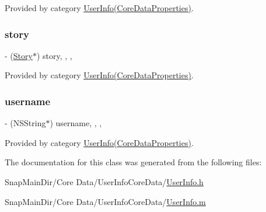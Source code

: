 Provided by category \hyperlink{category_user_info_07_core_data_properties_08_afdfa30db3ce1f305298e33e693e626e8}{User\+Info(\+Core\+Data\+Properties)}.

\hypertarget{interface_user_info_afeb3aca2ca38cb9b64ca84ee98e90260}{}\label{interface_user_info_afeb3aca2ca38cb9b64ca84ee98e90260} 
\subsubsection{\texorpdfstring{story}{story}}
{\footnotesize\ttfamily -\/ (\hyperlink{interface_story}{Story}$\ast$) story\hspace{0.3cm}{\ttfamily [read]}, {\ttfamily [write]}, {\ttfamily [nonatomic]}, {\ttfamily [retain]}}



Provided by category \hyperlink{category_user_info_07_core_data_properties_08_afeb3aca2ca38cb9b64ca84ee98e90260}{User\+Info(\+Core\+Data\+Properties)}.

\hypertarget{interface_user_info_a678541351323dc073a5696e15f0b3f3c}{}\label{interface_user_info_a678541351323dc073a5696e15f0b3f3c} 
\subsubsection{\texorpdfstring{username}{username}}
{\footnotesize\ttfamily -\/ (N\+S\+String$\ast$) username\hspace{0.3cm}{\ttfamily [read]}, {\ttfamily [write]}, {\ttfamily [nonatomic]}, {\ttfamily [retain]}}



Provided by category \hyperlink{category_user_info_07_core_data_properties_08_a678541351323dc073a5696e15f0b3f3c}{User\+Info(\+Core\+Data\+Properties)}.



The documentation for this class was generated from the following files\+:\begin{DoxyCompactItemize}
\item 
Snap\+Main\+Dir/\+Core Data/\+User\+Info\+Core\+Data/\hyperlink{_user_info_8h}{User\+Info.\+h}\item 
Snap\+Main\+Dir/\+Core Data/\+User\+Info\+Core\+Data/\hyperlink{_user_info_8m}{User\+Info.\+m}\end{DoxyCompactItemize}
